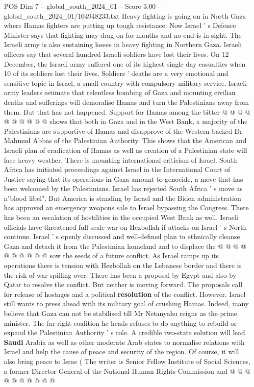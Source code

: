 \begin{textsample}{POS Dim 7 – global\_south\_2024\_01 – Score 3.00 – global\_south\_2024\_01/104948233.txt}
Heavy fighting is going on in North Gaza where Hamas fighters are putting up tough resistance.
Now Israel ' s Defence Minister says that fighting may drag on for months and no end is in sight.
The Israeli army is also sustaining losses in heavy fighting in Northern Gaza.
Israeli officers say that several hundred Israeli soldiers have lost their lives.
On 12 December, the Israeli army suffered one of its highest single day casualties when 10 of its soldiers lost their lives.
Soldiers ' deaths are a very emotional and sensitive topic in Israel, a small country with compulsory military service.
Israeli army leaders estimate that relentless bombing of Gaza and mounting civilian deaths and sufferings will demoralise Hamas and turn the Palestinians away from them.
But that has not happened.
Support for Hamas among the bitter @ @ @ @ @ @ @ @ @ @ shows that both in Gaza and in the West Bank, a majority of the Palestinians are supportive of Hamas and disapprove of the Western-backed Dr Mahmud Abbas of the Palestinian Authority.
This shows that the American and Israeli plan of eradication of Hamas as well as creation of a Palestinian state will face heavy weather.
There is mounting international criticism of Israel.
South Africa has initiated proceedings against Israel in the International Court of Justice saying that its operations in Gaza amount to genocide, a move that has been welcomed by the Palestinians.
Israel has rejected South Africa ' s move as a"blood libel".
But America is standing by Israel and the Biden administration has approved an emergency weapons sale to Israel bypassing the Congress.
There has been an escalation of hostilities in the occupied West Bank as well.
Israeli officials have threatened full scale war on Hezbollah if attacks on Israel ' s North continue.
Israel ' s openly discussed and well-defined plan to ethnically cleanse Gaza and detach it from the Palestinian homeland and to displace the @ @ @ @ @ @ @ @ @ @ sow the seeds of a future conflict.
As Israel ramps up its operations there is tension with Hezbollah on the Lebanese border and there is the risk of war spilling over.
There has been a proposal by Egypt and also by Qatar to resolve the conflict.
But neither is moving forward.
The proposals call for release of hostages and a political \textbf{resolution} of the conflict.
However, Israel still wants to press ahead with its military goal of crushing Hamas.
Indeed, many believe that Gaza can not be stabilised till Mr Netanyahu reigns as the prime minister.
The far-right coalition he heads refuses to do anything to rebuild or expand the Palestinian Authority ' s role.
A credible two-state solution will lead \textbf{Saudi} Arabia as well as other moderate Arab states to normalise relations with Israel and help the cause of peace and security of the region.
Of course, it will also bring peace to Israe ( The writer is Senior Fellow Institute of Social Sciences, a former Director General of the National Human Rights Commission and @ @ @ @ @ @ @ @ @ @

\end{textsample}

